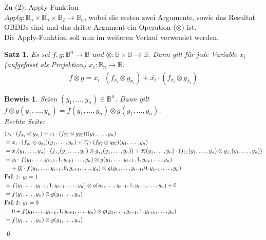 \documentclass[ngerman]{scrartcl}
\theoremstyle{custom}
\newtheorem{ms}[mdef]{Satz}
\newtheorem*{bw}{Beweis}
\newcommand{\0}{\mathbf{0}}
\newcommand{\1}{\mathbf{L}}
\newcommand{\bol}{\mathds{B}^n \rightarrow \mathds{B}}
\begin{document}
Zu (2): Apply-Funktion\\
$Apply: \mathds{B}_n \times \mathds{B}_n \times \mathds{B}_2
\rightarrow \mathds{B}_n$, wobei die ersten zwei Argumente, sowie das
Resultat OBDDs sind und das dritte Argument ein Operation ($\otimes$)
ist.\\
Die Apply-Funktion soll nun im weiteren Verlauf verwendet werden.

\begin{ms}
Es sei $f,g: \bol$ und $\otimes: \mathds{B} \times \mathds{B}
\rightarrow \mathds{B}$. Dann gilt f\"ur jede Variable $x_i$
(aufgefasst als Projektion) $x_i: \mathds{B}_n \rightarrow \mathds{B}$: 
\begin{align*}
f \otimes g = x_i \cdot (f_{x_i} \otimes g_{x_i}) + \overline{x_i}
\cdot (f_{\overline{x_i}} \otimes g_{\overline{x_i}})
\end{align*}
\end{ms}

\begin{bw}
Seien $(y_1, \dots, y_n) \in \mathds{B}^n$. Dann gilt $f \otimes
g(y_1,\dots,y_n) = f(y_1,\dots,y_n) \otimes g(y_1,\dots,y_n)$.\\

Rechte Seite:\\
\begin{align*}
&(x_i \cdot (f_{x_i} \otimes g_{x_i}) + \overline{x_i} \cdot
(f_{\overline{x_i}} \otimes g_{\overline{x_i}}))(y_1,\dots,y_n) \\
&= x_i \cdot (f_{x_i} \otimes g_{x_i})(y_1,\dots,y_n) + \overline{x_i} \cdot
(f_{\overline{x_i}} \otimes g_{\overline{x_i}})(y_1,\dots,y_n)\\
&= x_i(y_1,\dots,y_n) \cdot (f_{x_i}(y_1,\dots,y_n) \otimes g_{x_i}(y_1,\dots,y_n)) +
\overline{x_i}(y_1,\dots,y_n) \cdot (f_{\overline{x_i}}(y_1,\dots,y_n) \otimes
g_{\overline{x_i}}(y_1,\dots,y_n))\\
&= y_i \cdot f(y_1,\dots,y_{i-1},1,y_{i+1}\dots,y_n) \otimes
g(y_1,\dots,y_{i-1},1,y_{i+1}\dots,y_n) 
\\&\hspace{0.4cm} + \overline{y_i} \cdot
f(y_1,\dots,y_{i-1},0,y_{i+1},\dots,y_n) \otimes
g(y_1,\dots,y_{i-1},0,y_{i+1},\dots,y_n)\\
&\text{Fall 1: } y_i = 1\\
&= f(y_1,\dots,y_{i-1},1,y_{i+1},\dots,y_n) \otimes
g(y_1,\dots,y_{i-1},1,y_{i+1},\dots,y_n) + 0\\
&= f(y_1,\dots,y_n) \otimes g(y_1,\dots,y_n)\\
&\text{Fall 2: } y_1 = 0\\
&= 0 + f(y_1,\dots,y_{i-1},1,y_{i+1},\dots,y_n) \otimes
g(y_1,\dots,y_{i-1},1,y_{i+1},\dots,y_n)\\
&= f(y_1,\dots,y_n) \otimes g(y_1,\dots,y_n)\\
\end{align*}
\qed
\end{bw}
\end{document}
